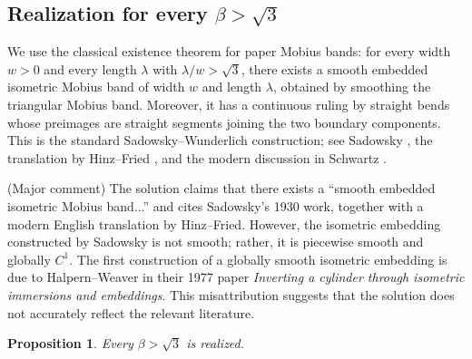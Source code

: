 \documentclass[12pt]{article}
\newtheorem{proposition}[theorem]{Proposition}
\newcommand{\review}[1]{\begin{reviewbox}#1\end{reviewbox}}
\begin{document}
\subsection{Realization for every \(\beta>\sqrt3\)}

We use the classical existence theorem for paper Mobius bands: for every width \(w>0\) and every length \(\lambda\) with \(\lambda/w>\sqrt3\), there exists a smooth embedded isometric Mobius band of width \(w\) and length \(\lambda\), obtained by smoothing the triangular Mobius band.  Moreover, it has a continuous ruling by straight bends whose preimages are straight segments joining the two boundary components.  This is the standard Sadowsky--Wunderlich construction; see Sadowsky \cite{Sadowsky}, the translation by Hinz--Fried \cite{HinzFried}, and the modern discussion in Schwartz \cite{Schwartz}.

\review{(Major comment) The solution claims that there exists a ``smooth embedded isometric Mobius band...'' and cites Sadowsky's 1930 work, together with a modern English translation by Hinz--Fried. However, the isometric embedding constructed by Sadowsky is not smooth; rather, it is piecewise smooth and globally $C^1$. The first construction of a globally smooth isometric embedding is due to Halpern--Weaver in their 1977 paper \emph{Inverting a cylinder through isometric immersions and embeddings}. This misattribution suggests that the solution does not accurately reflect the relevant literature.}

\begin{proposition}
Every \(\beta>\sqrt3\) is realized.
\end{proposition}
\end{document}
